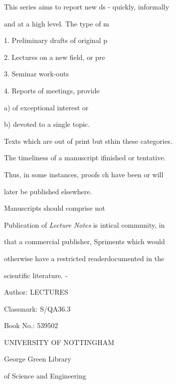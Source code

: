 \noindent
This series aims to report new ds - quickly, informally\par
and at a high level. The type of m\par
1. Preliminary drafts of original p\par
2. Lectures on a new field, or pre\par
3. Seminar work-outs\par
4. Reports of meetings, provide\par
\hspace*{1em}a) of exceptional interest or \par
\hspace*{1em}b) devoted to a single topic.\par
Texts which are out of print but sthin these categories.\par
The timeliness of a manuscript ifinished or tentative.\par
Thus, in some instances, proofs ch have been or will\par
later be published elsewhere.\par
Manuscripts should comprise not \par
Publication of \textit{Lecture Notes} is intical community, in\par
that a commercial publisher, Spriments which would\par
otherwise have a restricted readerdocumented in the\par
scientific literature. -\par

\begin{center}
Author: LECTURES\par
Classmark: S/QA36.3\par
Book No.: 539502\par

UNIVERSITY OF NOTTINGHAM

George Green Library

of Science and Engineering
\end{center}


